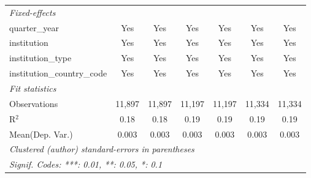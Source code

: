 \begin{tabular}{lcccccc}
   \midrule
   \emph{Fixed-effects}\\
   quarter\_year                      & Yes      & Yes        & Yes      & Yes       & Yes          & Yes\\  
   institution                        & Yes      & Yes        & Yes      & Yes       & Yes          & Yes\\  
   institution\_type                  & Yes      & Yes        & Yes      & Yes       & Yes          & Yes\\  
   institution\_country\_code         & Yes      & Yes        & Yes      & Yes       & Yes          & Yes\\  
   \midrule
   \emph{Fit statistics}\\
   Observations                       & 11,897   & 11,897     & 11,197   & 11,197    & 11,334       & 11,334\\  
   R$^2$                              & 0.18     & 0.18       & 0.19     & 0.19      & 0.19         & 0.19\\  
Mean(Dep. Var.) & 0.003 & 0.003 & 0.003 & 0.003 & 0.003 & 0.003 \\
   \midrule \midrule
   \multicolumn{7}{l}{\emph{Clustered (author) standard-errors in parentheses}}\\
   \multicolumn{7}{l}{\emph{Signif. Codes: ***: 0.01, **: 0.05, *: 0.1}}\\
\end{tabular}
\par\endgroup
